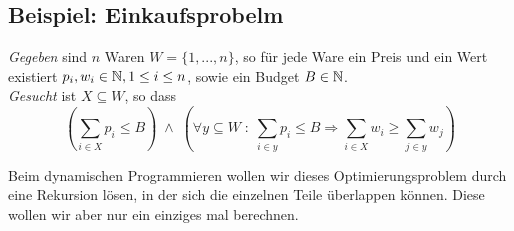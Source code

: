 \subsection{Beispiel: Einkaufsprobelm}

\emph{Gegeben} sind $n$ Waren $W = \{ 1 , ... , n \}$, so für jede Ware ein Preis und ein Wert existiert $p_i, w_i \in \mathbb{N}, 1 \leq i \leq n$, sowie ein Budget $B \in \mathbb{N}$.\\
\emph{Gesucht} ist $X \subseteq W$, so dass
$$
\left( \sum_{i\in X} p_i \leq B \right) \; \land \; \left( \forall y \subseteq W \; : \; \sum_{i \in y} p_i \leq B \Rightarrow \sum_{i \in X} w_i \geq \sum_{j \in y} w_j \right)
$$

Beim dynamischen Programmieren wollen wir dieses Optimierungsproblem durch eine Rekursion lösen, in der sich die einzelnen Teile überlappen können. Diese wollen wir aber nur ein einziges mal berechnen.\\

